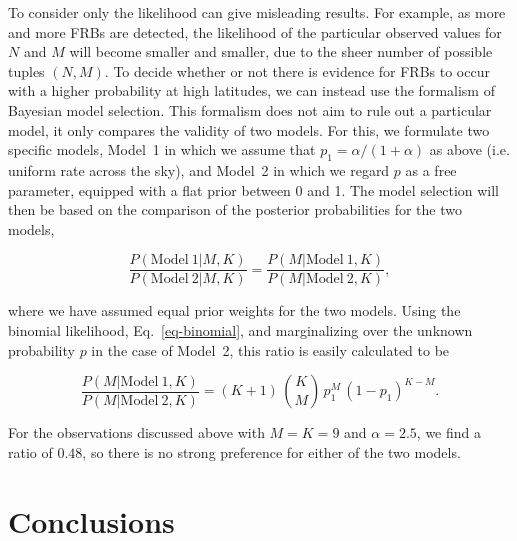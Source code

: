 \documentclass[useAMS,usenatbib]{mn2e}
\begin{document}
To consider only the likelihood can give misleading results. 
For example, as more and more FRBs are detected, the 
likelihood of the particular observed values for $N$ and $M$ 
will become smaller and smaller, due to the sheer number of 
possible tuples $(N,M)$.
To decide whether or not there is evidence for FRBs to occur with a 
higher probability at high latitudes, we can instead use the formalism 
of Bayesian model selection. This formalism does not aim to rule out a
particular model, it only compares the validity of two models. 
For this, we formulate two specific models, Model~1 in which we
assume that $p_1=\alpha/(1+\alpha)$ as above (i.e. uniform rate across the sky), and Model~2 in 
which we regard $p$ as a free parameter, equipped with a flat prior 
between 0 and 1. The model selection will then be based on the comparison
of the posterior probabilities for the two models,
   
   
\begin{equation}
	\frac{P(\mathrm{Model}~1|M,K)}{P(\mathrm{Model}~2|M,K)} = \frac{P(M|\mathrm{Model}~1,K)}{P(M|\mathrm{Model}~2,K)},
\end{equation}

\noindent where we have assumed equal prior weights for the two models. 
Using the binomial likelihood, Eq.~\eqref{eq-binomial}, and
marginalizing over the unknown probability $p$ in the case of Model~2, 
this ratio is easily calculated to be

\begin{equation}
\frac{P(M|\mathrm{Model}~1,K)}{P(M|\mathrm{Model}~2,K)} = (K + 1) \, \binom{K}{M} \, p_1^M \, \left(1 - p_1\right)^{K-M}.
\end{equation}

\noindent For the observations discussed above with $M = K = 9$ 
and $\alpha = 2.5$, we find a ratio of $0.48$, so there is
no strong preference for either of the two models.

\section{Conclusions}
\end{document}

